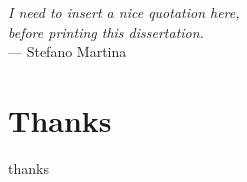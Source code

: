 
\begin{flushright}{\slshape
    I need to insert a nice quotation here, \\
    before printing this dissertation.} \\ \medskip
    --- Stefano Martina
\end{flushright}



\bigskip

\begingroup
\let\clearpage\relax
\let\cleardoublepage\relax
\let\cleardoublepage\relax
\chapter*{Thanks}
thanks
\endgroup



